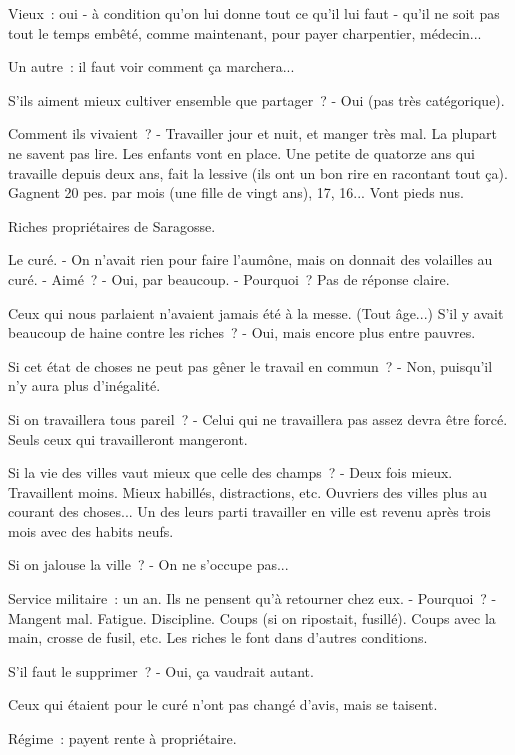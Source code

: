 \documentclass[french,twoside]{book} %
\begin{document}
Vieux : oui - à condition qu'on lui donne tout ce qu'il lui faut - qu'il ne soit pas tout le temps embêté, comme maintenant, pour payer charpentier, médecin...\par
Un autre : il faut voir comment ça marchera...\par
S'ils aiment mieux cultiver ensemble que partager ? - Oui (pas très catégorique).\par
Comment ils vivaient ? - Travailler jour et nuit, et manger très mal. La plupart ne savent pas lire. Les enfants vont en place. Une petite de quatorze ans qui travaille depuis deux ans, fait la lessive (ils ont un bon rire en racontant tout ça). Gagnent 20 pes. par mois (une fille de vingt ans), 17, 16... Vont pieds nus.\par
Riches propriétaires de Saragosse.\par
Le curé. - On n'avait rien pour faire l'aumône, mais on donnait des volailles au curé. - Aimé ? - Oui, par beaucoup. - Pourquoi ? Pas de réponse claire.\par
Ceux qui nous parlaient n'avaient jamais été à la messe. (Tout âge...) S'il y avait beaucoup de haine contre les riches ? - Oui, mais encore plus entre pauvres.\par
Si cet état de choses ne peut pas gêner le travail en commun ? - Non, puisqu'il n'y aura plus d'inégalité.\par
Si on travaillera tous pareil ? - Celui qui ne travaillera pas assez devra être forcé. Seuls ceux qui travailleront mangeront.\par
Si la vie des villes vaut mieux que celle des champs ? - Deux fois mieux. Travaillent moins. Mieux habillés, distractions, etc. Ouvriers des villes plus au courant des choses... Un des leurs parti travailler en ville est revenu après trois mois avec des habits neufs.\par
\par
Si on jalouse la ville ? - On ne s'occupe pas...\par
Service militaire : un an. Ils ne pensent qu'à retourner chez eux. - Pour­quoi ? - Mangent mal. Fatigue. Discipline. Coups (si on ripostait, fusillé). Coups avec la main, crosse de fusil, etc. Les riches le font dans d'autres conditions.\par
S'il faut le supprimer ? - Oui, ça vaudrait autant.\par
Ceux qui étaient pour le curé n'ont pas changé d'avis, mais se taisent.\par
Régime : payent rente à propriétaire.\par
\end{document}
